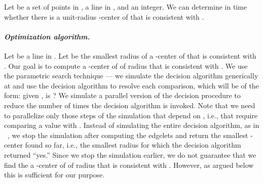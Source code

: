\documentclass[11pt]{myclass}
\begin{document}
\begin{lemma}
Let  be a set of  points in ,  a line in ,  and  an integer.  
We can determine in  time whether 
there is a unit-radius -center of  that is consistent with .
\end{lemma}


\paragraph{\textbf{\emph{Optimization algorithm.}}}
Let  be a line in .  
Let  be the smallest radius of a -center of  that is consistent with .  
Our goal is to compute a -center of  of radius  that is consistent with .  
We use the parametric search technique \cite{Meg83} --- we simulate the decision algorithm generically at  and use the decision algorithm to resolve each comparison, which will be of the form: given , is ?  We simulate a parallel version of the decision procedure to reduce the number of times the decision algorithm is invoked.
Note that we need to parallelize only those steps of the simulation that depend on , i.e., that require comparing a value with .  Instead of simulating the entire decision algorithm, as in ~\cite{Epp97}, we stop the simulation after computing the edgelets and return the smallest -center found so far, i.e., the smallest radius for which the decision algorithm returned ``yes.''  Since we stop the simulation earlier, we do not guarantee that we find the a -center of  of radius  that is consistent with .  However, as argued below this is sufficient for our purpose.  
\end{document}
